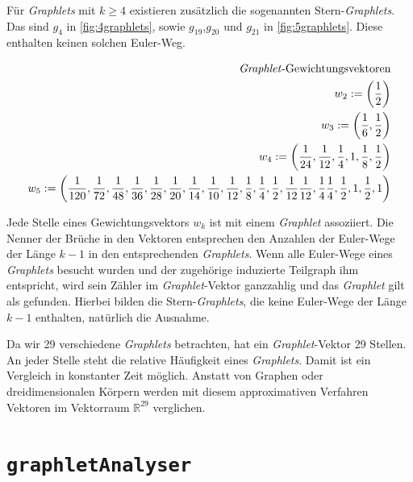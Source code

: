 \documentclass{report}
\begin{document}
F\"ur \textit{Graphlets} mit $k \geq 4$ existieren zus\"atzlich die sogenannten Stern-\textit{Graphlets}. Das sind $g_4$ in \ref{fig:4graphlets}, sowie $g_{19}$,$g_{20}$ und $g_{21}$ in \ref{fig:5graphlets}. Diese enthalten keinen solchen Euler-Weg.

\begin{center}
\begin{subequations}
\label{eq:w-vector}
\begin{align*}
\text{\textit{Graphlet}-Gewichtungsvektoren} \\
w_2 := \left( \frac{1}{2} \right) \\
w_3 := \left( \frac{1}{6}, \frac{1}{2} \right) \\
w_4 := \left( \frac{1}{24}, \frac{1}{12}, \frac{1}{4}, 1, \frac{1}{8},\frac{1}{2} \right) \\
w_5 := \left( \frac{1}{120}, \frac{1}{72}, \frac{1}{48}, \frac{1}{36}, \frac{1}{28}, \frac{1}{20}, \frac{1}{14}, \frac{1}{10}, \frac{1}{12}, \frac{1}{8}, \frac{1}{4}, \frac{1}{2}, \frac{1}{12} \frac{1}{12}, \frac{1}{4} \frac{1}{4}, \frac{1}{2}, 1, \frac{1}{2}, 1\right)
\end{align*}
\end{subequations}
\end{center}

Jede Stelle eines Gewichtungsvektors $w_k$ ist mit einem \textit{Graphlet} assoziiert. Die Nenner der Br\"uche in den Vektoren entsprechen den Anzahlen der Euler-Wege der L\"ange $k-1$ in den entsprechenden \textit{Graphlets}. Wenn alle Euler-Wege eines \textit{Graphlets} besucht wurden und der zugeh\"orige induzierte Teilgraph ihm entspricht, wird sein Z\"ahler im \textit{Graphlet}-Vektor ganzzahlig und das \textit{Graphlet} gilt als gefunden.
Hierbei bilden  die Stern-\textit{Graphlets}, die keine Euler-Wege der L\"ange $k-1$ enthalten, nat\"urlich die Ausnahme.
 
Da wir 29 verschiedene \textit{Graphlets} betrachten, hat ein \textit{Graphlet}-Vektor 29 Stellen. An jeder Stelle steht die relative H\"aufigkeit eines \textit{Graphlets}. Damit ist ein Vergleich in konstanter Zeit m\"oglich. Anstatt von Graphen oder dreidimensionalen K\"orpern werden mit diesem approximativen Verfahren Vektoren im Vektorraum $\mathbb{R}^{29}$ verglichen.



\section{\texttt{graphletAnalyser}}
\end{document}
